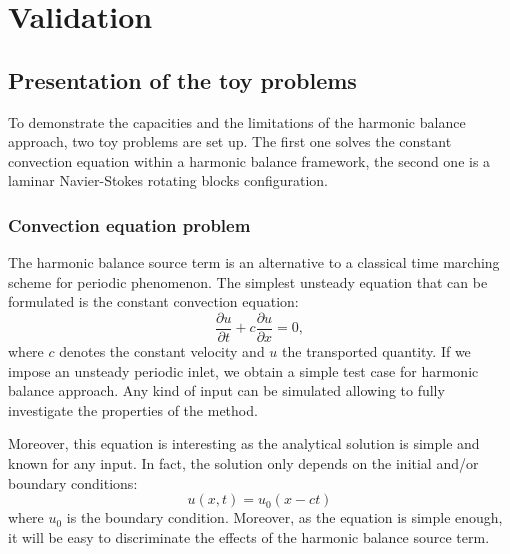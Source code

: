 \chapter{Validation} %
\label{cha:validation}

\section{Presentation of the toy problems}

To demonstrate the capacities and the limitations of
the harmonic balance approach, two toy problems are set up.
The first one solves the constant convection equation within 
a harmonic balance framework, the second one is a laminar
Navier-Stokes rotating blocks configuration.

\subsection{Convection equation problem} %
\label{sub:convection_equation_problem}

The harmonic balance source term is an alternative to
a classical time marching scheme for periodic phenomenon.
The simplest unsteady equation
that can be formulated is the constant convection equation:
\begin{equation}
  \label{eq:convection}
  \frac{\partial u}{\partial t} + c \frac{\partial u}{\partial x} = 0,
\end{equation}
where $c$ denotes the constant velocity and $u$ the transported quantity.
If we impose an unsteady periodic inlet,
we obtain a simple test case for harmonic balance approach. Any kind
of input can be simulated allowing to fully investigate the properties of 
the method.

Moreover, this equation is interesting as the analytical solution is simple
and known for any input. In fact, the solution only depends on the 
initial and/or boundary conditions:
\begin{equation}
  \label{eq:solconvanalytic}
    u(x, t) = u_0(x - ct)
\end{equation}
where $u_0$ is the boundary condition. Moreover, as the equation
is simple enough, it will be easy to discriminate the effects of the
harmonic balance source term.

